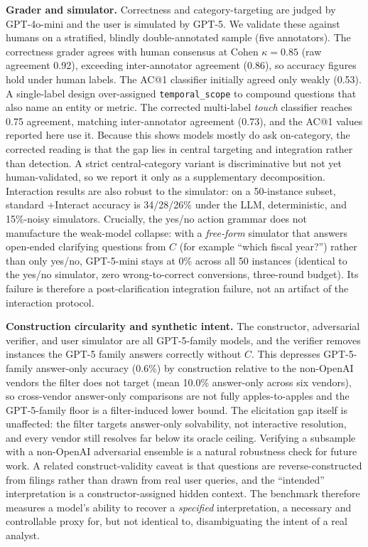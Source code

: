 \textbf{Grader and simulator.} Correctness and
category-targeting are judged by GPT-4o-mini and the user is simulated by GPT-5. We validate
these against humans on a stratified, blindly double-annotated sample (five annotators).
The correctness grader agrees with human consensus at Cohen $\kappa{=}0.85$ (raw agreement
0.92), exceeding inter-annotator agreement (0.86), so accuracy figures hold under human
labels. The AC@1 classifier initially agreed only weakly (0.53). A single-label design
over-assigned \texttt{temporal\_scope} to compound questions that also name an entity or
metric. The corrected multi-label \emph{touch} classifier reaches 0.75 agreement, matching
inter-annotator agreement (0.73), and the AC@1 values reported here use it. Because
this shows models mostly do ask on-category, the corrected reading is that the gap lies in
central targeting and integration rather than detection. A strict central-category variant is
discriminative but not yet human-validated, so we report it only as a supplementary
decomposition. Interaction results are also robust to the simulator: on a
50-instance subset, standard +Interact accuracy is 34/28/26\% under the LLM, deterministic,
and 15\%-noisy simulators. Crucially, the yes/no action grammar does not manufacture the
weak-model collapse: with a \emph{free-form} simulator that answers open-ended clarifying
questions from $C$ (for example ``which fiscal year?'') rather than only yes/no, GPT-5-mini
stays at 0\% across all 50 instances (identical to the yes/no simulator, zero
wrong-to-correct conversions, three-round budget). Its failure is therefore a
post-clarification integration failure, not an artifact of the interaction protocol.

\textbf{Construction circularity and synthetic intent.} The constructor, adversarial verifier, and user
simulator are all GPT-5-family models, and the verifier removes instances the GPT-5 family
answers correctly without $C$. This depresses GPT-5-family answer-only accuracy (0.6\%) by
construction relative to the non-OpenAI vendors the filter does not target (mean 10.0\%
answer-only across six vendors), so cross-vendor answer-only comparisons are not fully
apples-to-apples and the GPT-5-family floor is a filter-induced lower bound. The elicitation
gap itself is unaffected: the filter targets answer-only solvability, not interactive
resolution, and every vendor still resolves far below its oracle ceiling. Verifying a
subsample with a non-OpenAI adversarial ensemble is a natural robustness check for future work.
A related construct-validity caveat is that questions are reverse-constructed from filings
rather than drawn from real user queries, and the ``intended'' interpretation is a
constructor-assigned hidden context. The benchmark therefore measures a model's ability to
recover a \emph{specified} interpretation, a necessary and controllable proxy for, but not
identical to, disambiguating the intent of a real analyst.

